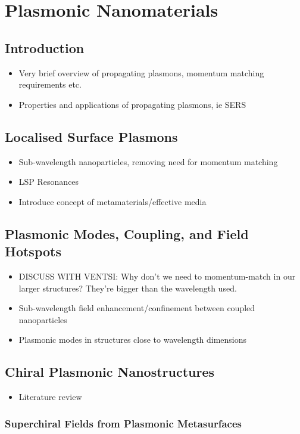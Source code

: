 \chapter{Plasmonic Nanomaterials}\label{sec:background:Plasmonics}

\section{Introduction}
\begin{itemize}
    \item Very brief overview of propagating plasmons, momentum matching requirements etc.
    \item Properties and applications of propagating plasmons, ie SERS
\end{itemize}

\section{Localised Surface Plasmons}\label{sec:background:Plasmonics:Metamaterials}
\begin{itemize}
    \item Sub-wavelength nanoparticles, removing need for momentum matching
    \item LSP Resonances
    \item Introduce concept of metamaterials/effective media
\end{itemize}

\section{Plasmonic Modes, Coupling, and Field Hotspots}
\begin{itemize}
    \item DISCUSS WITH VENTSI: Why don't we need to momentum-match in our larger structures? They're bigger than the wavelength used.
    \item Sub-wavelength field enhancement/confinement between coupled nanoparticles
    \item Plasmonic modes in structures close to wavelength dimensions
\end{itemize}

\section{Chiral Plasmonic Nanostructures}
\begin{itemize}
    \item Literature review
\end{itemize}

\subsection{Superchiral Fields from Plasmonic Metasurfaces}